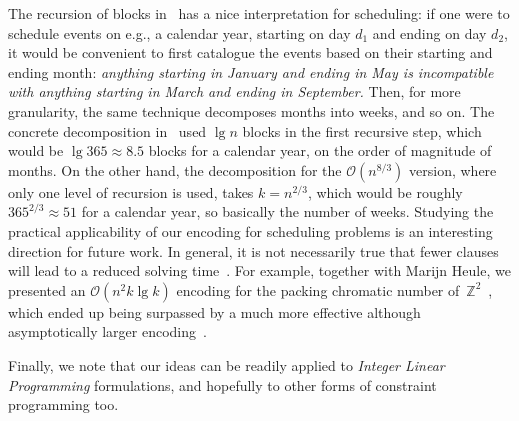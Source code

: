\documentclass[11pt]{article}
\renewcommand{\O}{\mathcal{O}}
\begin{document}
 The recursion of blocks in~ has a nice interpretation for scheduling: if one were to schedule events on e.g., a calendar year, starting on day $d_1$ and ending on day $d_2$, it would be convenient to first catalogue the events based on their starting and ending month: \emph{anything starting in January and ending in May is incompatible with anything starting in March and ending in September.} Then, for more granularity, the same technique decomposes months into weeks, and so on. The concrete decomposition in~ used $\lg n$ blocks in the first recursive step, which would be $\lg 365 \approx 8.5$ blocks for a calendar year, on the order of magnitude of months. On the other hand, the decomposition for the $\O(n^{8/3})$ version, where only one level of recursion is used, takes $k = n^{2/3}$, which would be roughly $365^{2/3} \approx 51$ for a calendar year, so basically the number of weeks.
Studying the practical applicability of our encoding for scheduling problems is an interesting direction for future work. In general, it is not necessarily true that fewer clauses will lead to a reduced solving time~\citep{DBLP:journals/jsat/Bjork11,haberlandtEffectiveAuxiliaryVariables2023}. For example, together with Marijn Heule, we presented an $\O(n^2 k \lg k)$ encoding for the packing chromatic number of~$\mathbb{Z}^2$~\citep{subercaseauxPackingChromaticNumber2022}, which ended up being surpassed by a much more effective although asymptotically larger encoding~\cite{subercaseauxPackingChromaticNumber2023d}.

Finally, we note that our ideas can be readily applied to \emph{Integer Linear Programming} formulations, and hopefully to other forms of constraint programming too.
\end{document}
